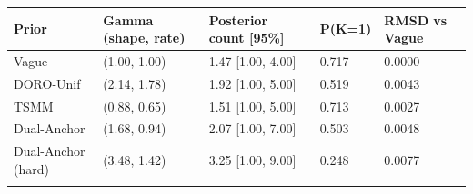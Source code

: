 \begin{longtable}{lllll}
\toprule
Prior & Gamma (shape, rate) & Posterior count [95\%] & P(K=1) & RMSD vs Vague \\
\midrule\endhead
Vague & (1.00, 1.00) & 1.47 [1.00, 4.00] & 0.717 & 0.0000 \\ \addlinespace[3pt]
DORO-Unif & (2.14, 1.78) & 1.92 [1.00, 5.00] & 0.519 & 0.0043 \\ \addlinespace[3pt]
TSMM & (0.88, 0.65) & 1.51 [1.00, 5.00] & 0.713 & 0.0027 \\ \addlinespace[3pt]
Dual-Anchor & (1.68, 0.94) & 2.07 [1.00, 7.00] & 0.503 & 0.0048 \\ \addlinespace[3pt]
Dual-Anchor (hard) & (3.48, 1.42) & 3.25 [1.00, 9.00] & 0.248 & 0.0077 \\ \addlinespace[3pt]
\bottomrule\end{longtable}
